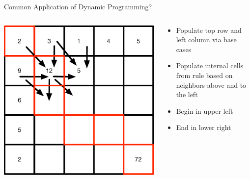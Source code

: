 \documentclass[aspectratio=169]{beamer}
\begin{document}
\begin{frame}{Common Application of  Dynamic Programming?}
\begin{columns}[T]
\begin{column}{0.5\textwidth}
\includegraphics[width=1\textwidth]{lectSeq/dp.pdf}
\end{column}
\begin{column}{0.5\textwidth}
	\begin{itemize}
	\item Populate top row and left column via base cases
	\item Populate internal cells from rule based on neighbors above and to the left
	\item Begin in upper left
	\item End in lower right
	\end{itemize}
\end{column}
\end{columns}
\end{frame}

\end{document}
